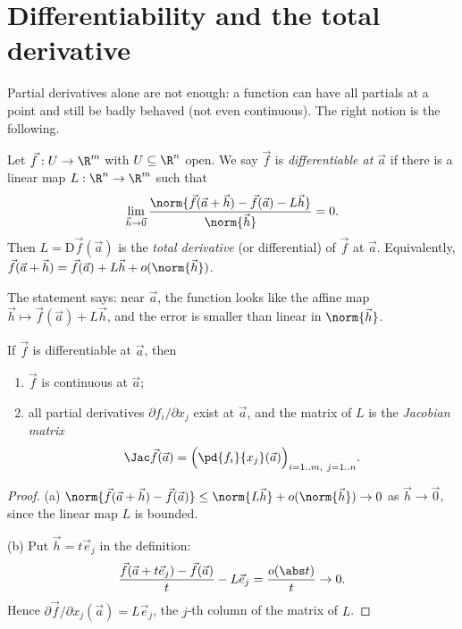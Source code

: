 \section{Differentiability and the total derivative}

Partial derivatives alone are not enough: a function can have all partials at a point and still be badly behaved (not even continuous). The right notion is the following.

\begin{definition}
Let $\vec f:U\to\R^m$ with $U\subseteq\R^n$ open. We say $\vec f$ is \emph{differentiable at $\vec a$} if there is a linear map $L:\R^n\to\R^m$ such that
\[
\lim_{\vec h\to\vec 0}\frac{\norm{\vec f(\vec a+\vec h)-\vec f(\vec a)-L\vec h}}{\norm{\vec h}}=0 .
\]
Then $L=\mathrm{D}\vec f(\vec a)$ is the \emph{total derivative} (or differential) of $\vec f$ at $\vec a$. Equivalently, $\vec f(\vec a+\vec h)=\vec f(\vec a)+L\vec h+o(\norm{\vec h})$.
\end{definition}

The statement says: near $\vec a$, the function looks like the affine map $\vec h\mapsto\vec f(\vec a)+L\vec h$, and the error is smaller than linear in $\norm{\vec h}$.

\begin{theorem}\label{thm:diffprops}
If $\vec f$ is differentiable at $\vec a$, then
\begin{enumerate}[label=(\alph*)]
  \item $\vec f$ is continuous at $\vec a$;
  \item all partial derivatives $\partial f_i/\partial x_j$ exist at $\vec a$, and the matrix of $L$ is the \emph{Jacobian matrix}
  \[
  \Jac\vec f(\vec a)=\Bigl(\pd{f_i}{x_j}(\vec a)\Bigr)_{i=1..m,\ j=1..n}.
  \]
\end{enumerate}
\end{theorem}

\begin{proof}
(a) $\norm{\vec f(\vec a+\vec h)-\vec f(\vec a)}\le\norm{L\vec h}+o(\norm{\vec h})\to0$ as $\vec h\to\vec 0$, since the linear map $L$ is bounded.

(b) Put $\vec h=t\vec e_j$ in the definition:
\[
\frac{\vec f(\vec a+t\vec e_j)-\vec f(\vec a)}{t}-L\vec e_j=\frac{o(\abs t)}{t}\to0 .
\]
Hence $\partial\vec f/\partial x_j(\vec a)=L\vec e_j$, the $j$-th column of the matrix of $L$.
\end{proof}

